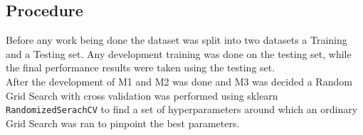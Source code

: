 \newcommand{\rfMaxDepth}{\textbf{42}}
\newcommand{\rfMaxFeatures}{\textbf{0.8}}
\newcommand{\rfMinSamplesLeaf}{\textbf{1}}
\newcommand{\rfMinSamplesSplit}{\textbf{3}}
\newcommand{\rfEstimators}{\textbf{437}}

\newcommand{\gbLearningRate}{\textbf{0.0295}}
\newcommand{\gbLoss}{\textbf{huber}}
\newcommand{\gbMaxDepth}{\textbf{10}}
\newcommand{\gbMinSamplesSplit}{\textbf{12}}
\newcommand{\gbEstimators}{\textbf{953}}
\newcommand{\gbSubsample}{\textbf{0.8046}}

\newcommand{\mlpActivation}{\textbf{relu}}
\newcommand{\mlpAlpha}{\textbf{0.0431}}
\newcommand{\mlpHiddenLayers}{\textbf{[300,200,100,50]}}
\newcommand{\mlpLearningRate}{\textbf{0.0014}}
\newcommand{\mlpSolver}{\textbf{adam}}
\newcommand{\mlpMaxIter}{\textbf{2000}}

\newcommand{\rfcMaxDepth}{\textbf{44}}
\newcommand{\rfcMaxFeatures}{\textbf{sqrt}}
\newcommand{\rfcMinSamplesLeaf}{\textbf{2}}
\newcommand{\rfcMinSamplesSplit}{\textbf{3}}
\newcommand{\rfcEstimators}{\textbf{629}}

\newcommand{\gbcLearningRate}{\textbf{0.014}}
\newcommand{\gbcLoss}{\textbf{log\_loss}}
\newcommand{\gbcMaxDepth}{\textbf{10}}
\newcommand{\gbcMinSamplesSplit}{\textbf{7}}
\newcommand{\gbcEstimators}{\textbf{1034}}
\newcommand{\gbcSubsample}{\textbf{0.8366}}

\newcommand{\mlpcActivation}{\textbf{relu}}
\newcommand{\mlpcAlpha}{\textbf{0.0101}}
\newcommand{\mlpcHiddenLayers}{\textbf{[300,200,100,50]}}
\newcommand{\mlpcLearningRate}{\textbf{0.0094}}
\newcommand{\mlpcSolver}{\textbf{adam}}
\newcommand{\mlpcMaxIter}{\textbf{2000}}

\newcommand{\dtMaxDepth}{\textbf{None}}
\newcommand{\dtMaxLeaves}{\textbf{50}}
\newcommand{\dtMinSamplesLeaf}{\textbf{5}}
\newcommand{\dtMinSamplesSplit}{\textbf{2}}
\newcommand{\dtMinImpurityDecrease}{\textbf{0}}

\newcommand{\ffnnAlpha}{\textbf{0.0009}}
\newcommand{\ffnnHiddenLayers}{\textbf{[300,200,100,50]}}
\newcommand{\ffnnLearningRate}{\textbf{0.0222}}
\newcommand{\ffnnEpochs}{\textbf{100}}

\newcommand{\mseDT}{0.2814}
\newcommand{\mseDTsklearn}{0.2818}
\newcommand{\mseFFNN}{0.3099}
\newcommand{\mseFFNNsklearn}{0.2498}
\newcommand{\mseEnsembleTotal}{0.4097}


\subsection{Procedure}
Before any work being done the dataset was split into two datasets a Training and a Testing set. Any development training was done on the testing set, while the final performance results were taken using the testing set.\\
After the development of M1 and M2 was done and M3 was decided a Random Grid Search with cross validation was performed using sklearn \texttt{RandomizedSerachCV} to find a set of hyperparameters around which an ordinary Grid Search was ran to pinpoint the best parameters.
